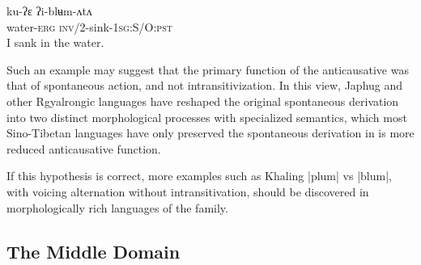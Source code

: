 \documentclass[oldfontcommands,oneside,a4paper,11pt]{article}
\newcommand{\ipa}[1]{{\phon \mbox{#1}}} %
\begin{document}
\begin{exe}
\ex \label{ex:iblumata}
\gll
\ipa{ku-ʔɛ} \ipa{ʔi-blʉm-ʌtʌ} \\
water-\textsc{erg} \textsc{inv/2}-sink-\textsc{1sg:S/O:pst}\\
\glt I sank in the water.
\end{exe}

Such an example may suggest that the primary function of the anticausative was that of spontaneous action, and not intransitivization. In this view, Japhug and other Rgyalrongic languages have reshaped the original spontaneous derivation into two distinct morphological processes with specialized semantics, which most Sino-Tibetan languages have only preserved the spontaneous derivation in is more reduced anticausative function. 

If this hypothesis is correct, more examples such as Khaling \ipa{|plum|} vs \ipa{|blum|}, with voicing alternation without intransitivation, should be discovered in morphologically rich languages of the family.

\subsection{The Middle Domain}
%
%
\end{document}
